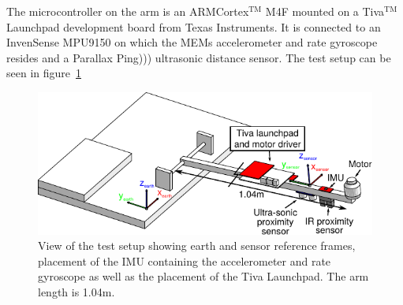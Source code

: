 The microcontroller on the arm is an ARM\textregistered Cortex\(^{\text{TM}}\)
M4F mounted on a Tiva\(^{\text{TM}}\) Launchpad development board from Texas Instruments.
It is connected to an InvenSense MPU9150 on which the MEMs accelerometer and
rate gyroscope resides and a Parallax Ping))) ultrasonic distance sensor. The
test setup can be seen in figure~\ref{fig:labsetup}
\begin{figure}
	\centering
	\includegraphics[width=\columnwidth]{pictures/arbejds_tegning}
	\caption{View of the test setup showing earth and sensor reference frames, placement of the IMU containing the 
	accelerometer and rate gyroscope as well as the placement of the Tiva Launchpad. The arm length is 1.04m.}
	\label{fig:labsetup}
\end{figure}
